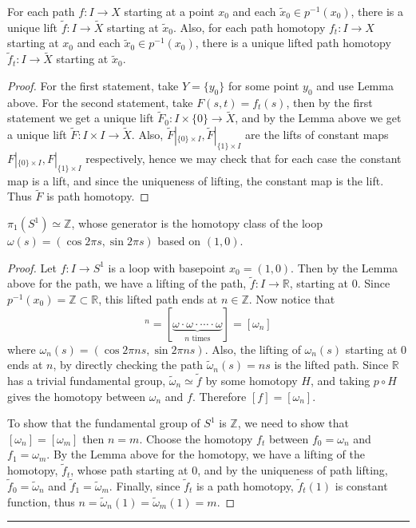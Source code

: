\begin{lemma} For each path $f:I\rightarrow X$ starting at a point $x_0$ and each $\tilde{x}_0\in p^{-1}(x_0)$, there is a unique lift $\tilde{f}:I\rightarrow \tilde{X}$ starting at $\tilde{x}_0$. Also, for each path homotopy $f_t:I\rightarrow X$ starting at $x_0$ and each $\tilde{x}_0\in p^{-1}(x_0)$, there is a unique lifted path homotopy $\tilde{f}_t:I\rightarrow \tilde{X}$ starting at $\tilde{x}_0$.
\end{lemma}
\begin{proof}
For the first statement, take $Y=\{y_0\}$ for some point $y_0$ and use Lemma above. For the second statement, take $F(s,t)=f_t(s)$, then by the first statement we get a unique lift $\tilde{F}_0:I\times \{0\}\rightarrow \tilde{X}$, and by the Lemma above we get a unique lift $\tilde{F}:I\times I\rightarrow \tilde{X}$. Also, $\tilde{F}|_{\{0\}\times I},\tilde{F}|_{\{1\}\times I}$ are the lifts of constant maps $F|_{\{0\}\times I},F|_{\{1\}\times I}$ respectively, hence we may check that for each case the constant map is a lift, and since the uniqueness of lifting, the constant map is the lift. Thus $\tilde{F}$ is path homotopy.
\end{proof}

\begin{thm} $\pi_1(S^1)\simeq \mathbb{Z}$, whose generator is the homotopy class of the loop $\omega(s)=(\cos 2\pi s,\sin 2\pi s)$ based on $(1,0)$.
\end{thm}
\begin{proof}
Let $f:I\rightarrow S^1$ is a loop with basepoint $x_0=(1,0)$. Then by the Lemma above for the path, we have a lifting of the path, $\tilde{f}:I\rightarrow \mathbb{R}$, starting at $0$. Since $p^{-1}(x_0)=\mathbb{Z}\subset \mathbb{R}$, this lifted path ends at $n\in \mathbb{Z}$. Now notice that
\begin{equation}
[\omega]^n=[\underbrace{\omega\cdot\omega\cdot\cdots\cdot\omega}_{n\textrm{ times}}]=[\omega_n]
\end{equation}
where $\omega_n(s)=(\cos 2\pi ns, \sin 2\pi ns)$. Also, the lifting of $\omega_n(s)$ starting at $0$ ends at $n$, by directly checking the path $\tilde{\omega}_n(s)=ns$ is the lifted path. Since $\mathbb{R}$ has a trivial fundamental group, $\tilde{\omega}_n\simeq \tilde{f}$ by some homotopy $H$, and taking $p\circ H$ gives the homotopy between $\omega_n$ and $f$. Therefore $[f]=[\omega_n]$.

To show that the fundamental group of $S^1$ is $\mathbb{Z}$, we need to show that $[\omega_n]=[\omega_m]$ then $n=m$. Choose the homotopy $f_t$ between $f_0=\omega_n$ and $f_1=\omega_m$. By the Lemma above for the homotopy, we have a lifting of the homotopy, $\tilde{f}_t$, whose path starting at $0$, and by the uniqueness of path lifting, $\tilde{f}_0=\tilde{\omega}_n$ and $\tilde{f}_1=\tilde{\omega}_m$. Finally, since $\tilde{f}_t$ is a path homotopy, $\tilde{f}_t(1)$ is constant function, thus $n=\tilde{\omega}_n(1)=\tilde{\omega}_m(1)=m$.
\end{proof}
\noindent\rule{\textwidth}{1pt}
\newline